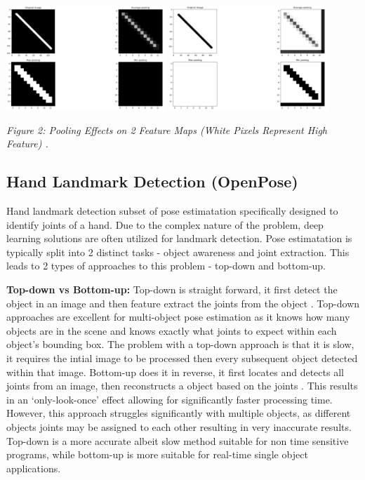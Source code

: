 \documentclass[11pt]{article}
\def\paraskip{\vskip 0.4cm}
\begin{document}
        \begin{center}
            \includegraphics[width=6cm]{blackpool.png}
            \hspace{2cm}
            \includegraphics[width=6cm]{whitepool.png}
            \\
            \raggedright \textit{
            Figure 2: Pooling Effects on 2 Feature Maps (White Pixels Represent High Feature) \cite{poolingdiff}.
            }
        \end{center}

    \subsection{Hand Landmark Detection (OpenPose)}
        Hand landmark detection subset of pose estimatation specifically designed to identify joints of a hand. Due to the complex nature of the problem, deep learning solutions are often utilized for landmark detection. Pose estimatation is typically split into 2 distinct tasks - object awareness and joint extraction. This leads to 2 types of approaches to this problem - top-down and bottom-up. 
        
        \paraskip

        \noindent\textbf{Top-down vs Bottom-up: } Top-down is straight forward, it first detect the object in an image and then feature extract the joints from the object \cite{poseest}. Top-down approaches are excellent for multi-object pose estimation as it knows how many objects are in the scene and knows exactly what joints to expect within each object's bounding box. The problem with a top-down approach is that it is slow, it requires the intial image to be processed then every subsequent object detected within that image. Bottom-up does it in reverse, it first locates and detects all joints from an image, then reconstructs a object based on the joints \cite{poseest}. This results in an `only-look-once' effect allowing for significantly faster processing time. However, this approach struggles significantly with multiple objects, as different objects joints may be assigned to each other resulting in very inaccurate results. Top-down is a more accurate albeit slow method suitable for non time sensitive programs, while bottom-up is more suitable for real-time single object applications. 
\end{document}
